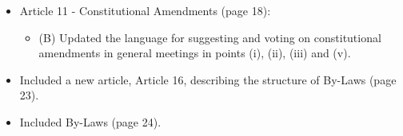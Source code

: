 \documentclass[]{report}
\begin{document}
\begin{itemize}
		\item Article 11 - Constitutional Amendments (page 18):
		\begin{itemize}
			\item (B) Updated the language for suggesting and voting on constitutional amendments in general meetings in points (i), (ii), (iii) and (v).
		\end{itemize}
		
		\item Included a new article, Article 16, describing the structure of By-Laws (page 23).
		
		\item Included By-Laws (page 24).
	
	\end{itemize}
\end{document}
